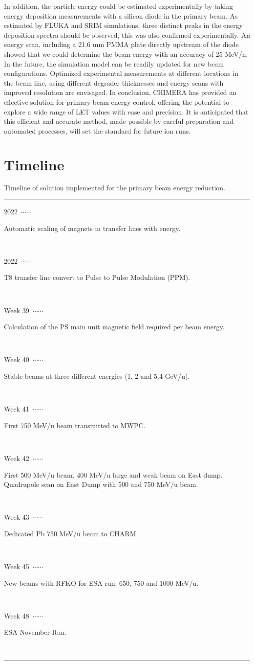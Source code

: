 \documentclass{cernatsnote}
\newcommand\ytl[2]{%
  \parbox[b]{8em}{\hfill{\color{black}#1}~$\cdots\cdots$~}%
  \makebox[0pt][c]{$\bullet$}\vrule\quad%
  \parbox[c]{8.5cm}{\vspace{7pt}\color{black}\raggedright #2.\\[7pt]}\\[-3pt]%
}
\begin{document}
In addition, the particle energy could be estimated experimentally by taking energy deposition measurements with a silicon diode in the primary beam. As estimated by FLUKA and SRIM simulations, three distinct peaks in the energy deposition spectra should be observed, this was also confirmed experimentally. An energy scan, including a 21.6 mm PMMA plate directly upstream of the diode showed that we could determine the beam energy with an accuracy of 25 MeV/n. In the future, the simulation model can be readily updated for new beam configurations. Optimized experimental measurements at different locations in the beam line, using different degrader thicknesses and energy scans with improved resolution are envisaged. In conclusion, CHIMERA has provided an effective solution for primary beam energy control, offering the potential to explore a wide range of LET values with ease and precision. It is anticipated that this efficient and accurate method, made possible by careful preparation and automated processes, will set the standard for future ion runs.

\section{Timeline}

\begin{table}[H]
\caption{Timeline of solution implemented for the primary beam energy reduction.}
\centering
\begin{minipage}[t]{.7\linewidth}
\color{gray}
\rule{\linewidth}{1pt}
\ytl{2022}{Automatic scaling of magnets in transfer lines with energy}
\ytl{2022}{T8 transfer line convert to Pulse to Pulse Modulation (PPM)}
\ytl{Week 39}{Calculation of the PS main unit magnetic field required per beam energy}
\ytl{Week 40}{Stable beams at three different energies (1, 2 and 5.4 GeV/u)}
\ytl{Week 41}{First 750 MeV/u beam transmitted to MWPC}
\ytl{Week 42}{First 500 MeV/u beam. 400 MeV/u large and weak beam on East dump. Quadrupole scan on East Dump with 500 and 750 MeV/u beam}
\ytl{Week 43}{Dedicated Pb 750 MeV/u beam to CHARM}
\ytl{Week 45}{New beams with RFKO for ESA run: 650, 750 and 1000 MeV/u}
\ytl{Week 48}{ESA November Run}
\bigskip
\rule{\linewidth}{1pt}%
\end{minipage}%
\end{table}



\end{document}
